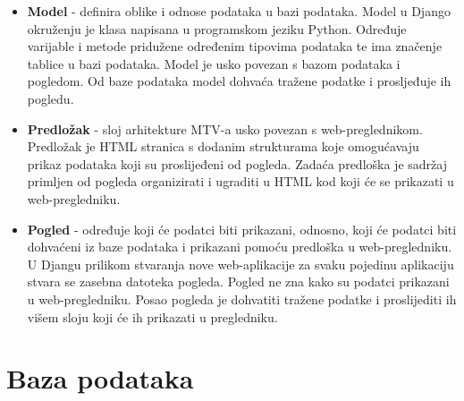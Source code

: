 

	\begin{itemize}
		\item 	\textbf{Model} - definira oblike i odnose podataka u bazi podataka. Model u Django okruženju je klasa napisana
				u programskom jeziku Python. Određuje varijable i metode pridužene određenim tipovima podataka te ima značenje
				tablice u bazi podataka. Model je usko povezan s bazom podataka i pogledom. Od baze podataka model dohvaća tražene
				podatke i prosljeđuje ih pogledu.
		\item 	\textbf{Predložak} - sloj arhitekture MTV-a usko povezan s web-preglednikom. Predložak je HTML stranica s dodanim
				strukturama koje omogućavaju prikaz podataka koji su proslijeđeni od pogleda. Zadaća predloška je sadržaj primljen
				od pogleda organizirati i ugraditi u HTML kod koji će se prikazati u web-pregledniku.
		\item 	\textbf{Pogled} - određuje koji će podatci biti prikazani, odnosno, koji će podatci biti dohvaćeni iz baze podataka
				i prikazani pomoću predloška u web-pregledniku. U Djangu prilikom stvaranja nove web-aplikacije za svaku pojedinu
				aplikaciju stvara se zasebna datoteka pogleda. Pogled ne zna kako su podatci prikazani u web-pregledniku. Posao
				pogleda je dohvatiti tražene podatke i proslijediti ih višem sloju koji će ih prikazati u pregledniku.
	\end{itemize}
	
		

		

				
		\section{Baza podataka}
			
